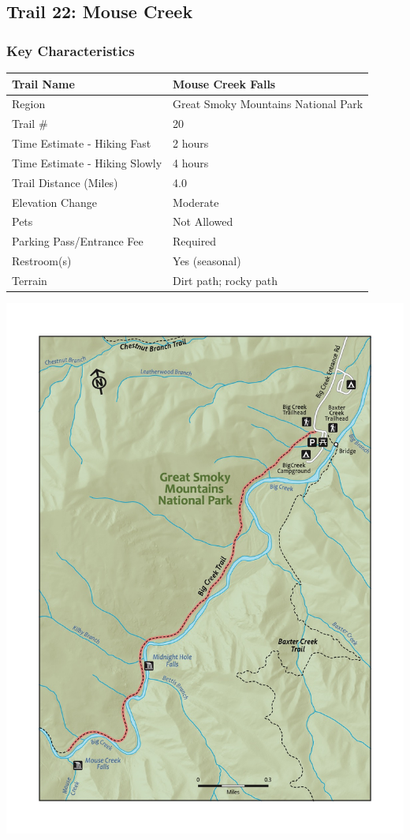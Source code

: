 \documentclass[
  letterpaper,
  DIV=11,
  numbers=noendperiod]{scrartcl}
\begin{document}
\hypertarget{trail-22-mouse-creek}{%
\subsection{Trail 22: Mouse Creek}\label{trail-22-mouse-creek}}

\hypertarget{key-characteristics-21}{%
\subsubsection{Key Characteristics}\label{key-characteristics-21}}

\begin{longtable}[]{@{}ll@{}}
\toprule\noalign{}
Trail Name & Mouse Creek Falls \\
\midrule\noalign{}
\endhead
\bottomrule\noalign{}
\endlastfoot
Region & Great Smoky Mountains National Park \\
Trail \# & 20 \\
Time Estimate - Hiking Fast & 2 hours \\
Time Estimate - Hiking Slowly & 4 hours \\
Trail Distance (Miles) & 4.0 \\
Elevation Change & Moderate \\
Pets & Not Allowed \\
Parking Pass/Entrance Fee & Required \\
Restroom(s) & Yes (seasonal) \\
Terrain & Dirt path; rocky path \\
\end{longtable}

\includegraphics{maps/trail-22-map.jpeg}
\end{document}
